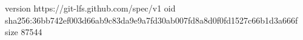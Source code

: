 version https://git-lfs.github.com/spec/v1
oid sha256:36bb742ef003d66ab9c83da9e9a7fd30ab007fd8a8d0f0fd1527c66b1d3a666f
size 87544
